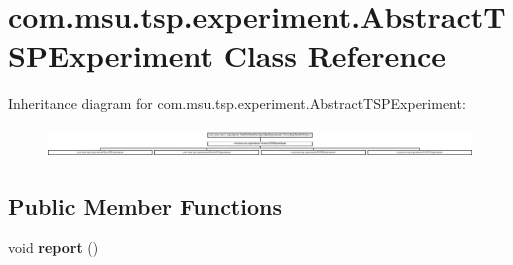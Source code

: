 \hypertarget{classcom_1_1msu_1_1tsp_1_1experiment_1_1AbstractTSPExperiment}{\section{com.\-msu.\-tsp.\-experiment.\-Abstract\-T\-S\-P\-Experiment Class Reference}
\label{classcom_1_1msu_1_1tsp_1_1experiment_1_1AbstractTSPExperiment}
}
Inheritance diagram for com.\-msu.\-tsp.\-experiment.\-Abstract\-T\-S\-P\-Experiment\-:\begin{figure}[H]
\begin{center}
\leavevmode
\includegraphics[height=0.783582cm]{classcom_1_1msu_1_1tsp_1_1experiment_1_1AbstractTSPExperiment}
\end{center}
\end{figure}
\subsection*{Public Member Functions}
\begin{DoxyCompactItemize}
\item 
\hypertarget{classcom_1_1msu_1_1tsp_1_1experiment_1_1AbstractTSPExperiment_a59d28e7a5d374f6773d6ce2bfc667923}{void {\bfseries report} ()}\label{classcom_1_1msu_1_1tsp_1_1experiment_1_1AbstractTSPExperiment_a59d28e7a5d374f6773d6ce2bfc667923}

\end{DoxyCompactItemize}
